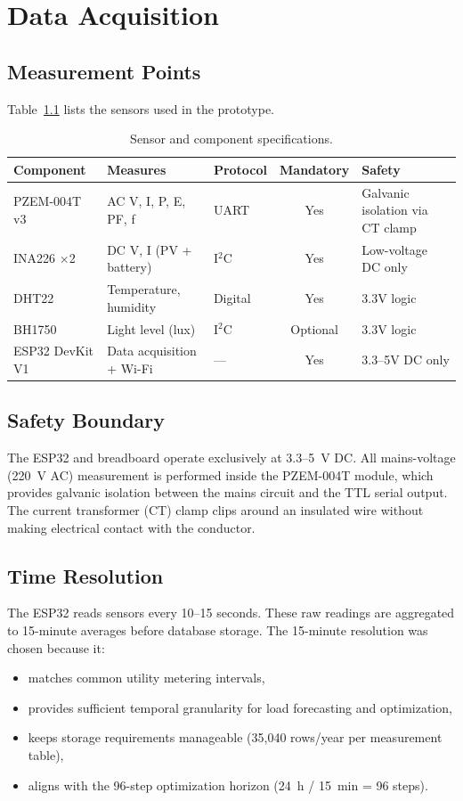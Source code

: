 \chapter{Data Acquisition}
\label{ch:data}

\section{Measurement Points}

Table~\ref{tab:sensors} lists the sensors used in the prototype.

\begin{table}[H]
\centering
\caption{Sensor and component specifications.}
\label{tab:sensors}
\begin{tabularx}{\textwidth}{lllcX}
\toprule
\textbf{Component} & \textbf{Measures} & \textbf{Protocol} & \textbf{Mandatory} & \textbf{Safety} \\
\midrule
PZEM-004T v3 & AC V, I, P, E, PF, f & UART & Yes & Galvanic isolation via CT clamp \\
INA226 $\times$2 & DC V, I (PV + battery) & I$^2$C & Yes & Low-voltage DC only \\
DHT22 & Temperature, humidity & Digital & Yes & 3.3V logic \\
BH1750 & Light level (lux) & I$^2$C & Optional & 3.3V logic \\
ESP32 DevKit V1 & Data acquisition + Wi-Fi & --- & Yes & 3.3--5V DC only \\
\bottomrule
\end{tabularx}
\end{table}

\section{Safety Boundary}

The ESP32 and breadboard operate exclusively at 3.3--5~V DC. All mains-voltage (220~V AC) measurement is performed inside the PZEM-004T module, which provides galvanic isolation between the mains circuit and the TTL serial output. The current transformer (CT) clamp clips around an insulated wire without making electrical contact with the conductor.

\section{Time Resolution}

The ESP32 reads sensors every 10--15 seconds. These raw readings are aggregated to 15-minute averages before database storage. The 15-minute resolution was chosen because it:
\begin{itemize}[nosep]
    \item matches common utility metering intervals,
    \item provides sufficient temporal granularity for load forecasting and optimization,
    \item keeps storage requirements manageable (35,040 rows/year per measurement table),
    \item aligns with the 96-step optimization horizon (24~h / 15~min = 96 steps).
\end{itemize}


